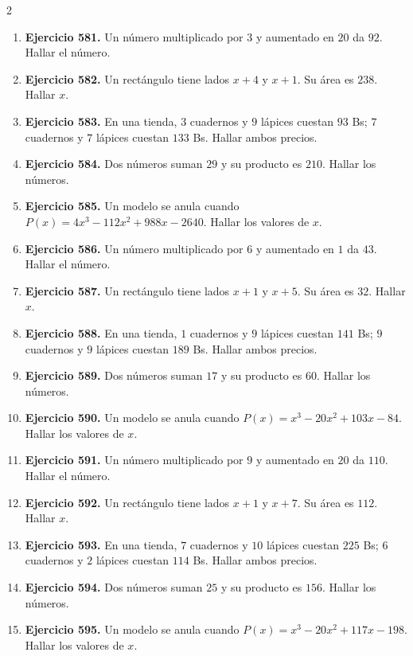 \documentclass[10pt,a4paper]{article}
\begin{document}
\begin{multicols}{2}
\begin{enumerate}[label=\textbf{\arabic*.}]
\item \textbf{Ejercicio 581.} Un número multiplicado por \(3\) y aumentado en \(20\) da \(92\). Hallar el número.
\item \textbf{Ejercicio 582.} Un rectángulo tiene lados \(x+4\) y \(x+1\). Su área es \(238\). Hallar \(x\).
\item \textbf{Ejercicio 583.} En una tienda, \(3\) cuadernos y \(9\) lápices cuestan \(93\) Bs; \(7\) cuadernos y \(7\) lápices cuestan \(133\) Bs. Hallar ambos precios.
\item \textbf{Ejercicio 584.} Dos números suman \(29\) y su producto es \(210\). Hallar los números.
\item \textbf{Ejercicio 585.} Un modelo se anula cuando \(P(x)=4 x^{3} - 112 x^{2} + 988 x - 2640\). Hallar los valores de \(x\).
\item \textbf{Ejercicio 586.} Un número multiplicado por \(6\) y aumentado en \(1\) da \(43\). Hallar el número.
\item \textbf{Ejercicio 587.} Un rectángulo tiene lados \(x+1\) y \(x+5\). Su área es \(32\). Hallar \(x\).
\item \textbf{Ejercicio 588.} En una tienda, \(1\) cuadernos y \(9\) lápices cuestan \(141\) Bs; \(9\) cuadernos y \(9\) lápices cuestan \(189\) Bs. Hallar ambos precios.
\item \textbf{Ejercicio 589.} Dos números suman \(17\) y su producto es \(60\). Hallar los números.
\item \textbf{Ejercicio 590.} Un modelo se anula cuando \(P(x)=x^{3} - 20 x^{2} + 103 x - 84\). Hallar los valores de \(x\).
\item \textbf{Ejercicio 591.} Un número multiplicado por \(9\) y aumentado en \(20\) da \(110\). Hallar el número.
\item \textbf{Ejercicio 592.} Un rectángulo tiene lados \(x+1\) y \(x+7\). Su área es \(112\). Hallar \(x\).
\item \textbf{Ejercicio 593.} En una tienda, \(7\) cuadernos y \(10\) lápices cuestan \(225\) Bs; \(6\) cuadernos y \(2\) lápices cuestan \(114\) Bs. Hallar ambos precios.
\item \textbf{Ejercicio 594.} Dos números suman \(25\) y su producto es \(156\). Hallar los números.
\item \textbf{Ejercicio 595.} Un modelo se anula cuando \(P(x)=x^{3} - 20 x^{2} + 117 x - 198\). Hallar los valores de \(x\).

\end{enumerate}
\end{multicols}
\end{document}
